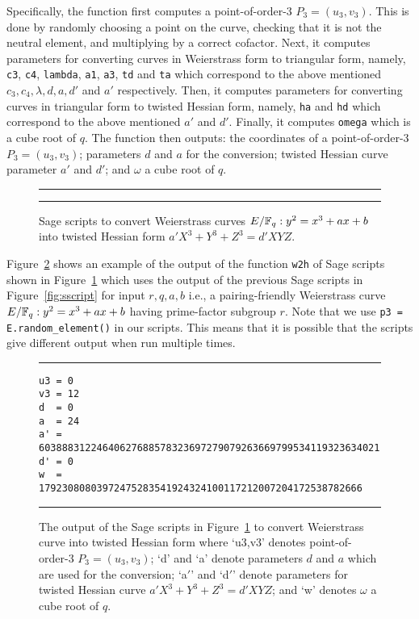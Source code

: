 Specifically, the function first computes a point-of-order-3 $P_3 = (u_3,v_3)$.
This is done by randomly choosing a point on the curve,
checking that it is not the neutral element,
and multiplying by a correct cofactor.
Next, it computes parameters for converting curves in Weierstrass form to triangular form,
namely, \texttt{c3}, \texttt{c4}, \texttt{lambda}, \texttt{a1}, \texttt{a3}, \texttt{td} and \texttt{ta}
which correspond to the above mentioned $c_3, c_4, \lambda, d, a, d'$ and $a'$ respectively.
Then, it computes parameters for converting curves in triangular form to twisted Hessian form,
namely, \texttt{ha} and \texttt{hd} which correspond to the above mentioned $a'$ and $d'$.
Finally, it computes \texttt{omega} which is a cube root of $q$.
The function then outputs:
the coordinates of a point-of-order-3 $P_3 = (u_3,v_3)$;
parameters $d$ and $a$ for the conversion;
twisted Hessian curve parameter $a'$ and $d'$;
and $\omega$ a cube root of $q$.


\begin{figure}
\hrule\medskip
{}
\hrule
\caption{Sage scripts to convert Weierstrass curves $E/\mathbb{F}_{q}: y^2 = x^3 + ax + b$
into twisted Hessian form $a'X^3 + Y^3 + Z^3 = d'XYZ$.}
\label{fig:scon}
\end{figure}

Figure~\ref{fig:conout} shows an example of the output of the function \texttt{w2h} of Sage scripts shown in Figure~\ref{fig:scon}
which uses the output of the previous Sage scripts in Figure~\ref{fig:sscript} for input $r,q,a,b$
i.e., a pairing-friendly Weierstrass curve $E/\mathbb{F}_{q}: y^2 = x^3 + ax + b$ having prime-factor subgroup $r$.
Note that we use \texttt{p3 = E.random\_element()} in our scripts.
This means that it is possible that the scripts give different output when run multiple times.

\begin{figure}
\hrule\medskip
{\scriptsize
\begin{verbatim}
u3 = 0
v3 = 12
d  = 0
a  = 24
a' = 60388831224640627688578323697279079263669799534119323634021
d' = 0
w  = 17923080803972475283541924324100117212007204172538782666
\end{verbatim}
}
\hrule
\caption{The output of the Sage scripts in Figure~\ref{fig:scon}
to convert Weierstrass curve into twisted Hessian form where
`u3,v3' denotes point-of-order-3 $P_3 = (u_3,v_3)$;
`d' and `a' denote parameters $d$ and $a$ which are used for the conversion;
`a$'$' and `d$'$' denote parameters for twisted Hessian curve $a'X^3 + Y^3 + Z^3 = d'XYZ$; and
`w' denotes $\omega$ a cube root of $q$.
}
\label{fig:conout}
\end{figure}


